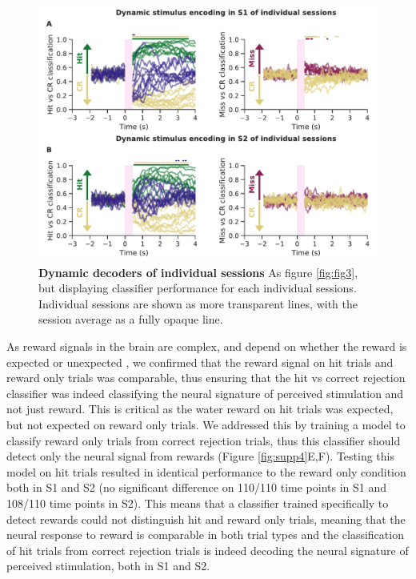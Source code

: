 \begin{figure}[!h]
\hspace*{-0.2in}
\includegraphics[scale=0.76]{figures/supplements/Supplementary_Figure5.pdf}
\caption[\textbf{Dynamic decoders of individual sessions}]{\textbf{Dynamic decoders of individual sessions} As figure \ref{fig:fig3}, but displaying classifier performance for each individual sessions. Individual sessions are shown as more transparent lines, with the session average as a fully opaque line.
} 
\label{fig:supp5}
\end{figure}

As reward signals in the brain are complex, and depend on whether the reward is expected or unexpected \cite{schultz_multiple_2000}, we confirmed that the reward signal on hit trials and reward only trials was comparable, thus ensuring that the hit vs correct rejection classifier was indeed classifying the neural signature of perceived stimulation and not just reward. This is critical as the water reward on hit trials was expected, but not expected on reward only trials. We addressed this by training a model to classify reward only trials from correct rejection trials, thus this classifier should detect only the neural signal from rewards (Figure \ref{fig:supp4}E,F). Testing this model on hit trials resulted in identical performance to the reward only condition both in S1 and S2 (no significant difference on 110/110 time points in S1 and 108/110 time points in S2). This means that a classifier trained specifically to detect rewards could not distinguish hit and reward only trials, meaning that the neural response to reward is comparable in both trial types and the classification of hit trials from correct rejection trials is indeed decoding the neural signature of perceived stimulation, both in S1 and S2.


